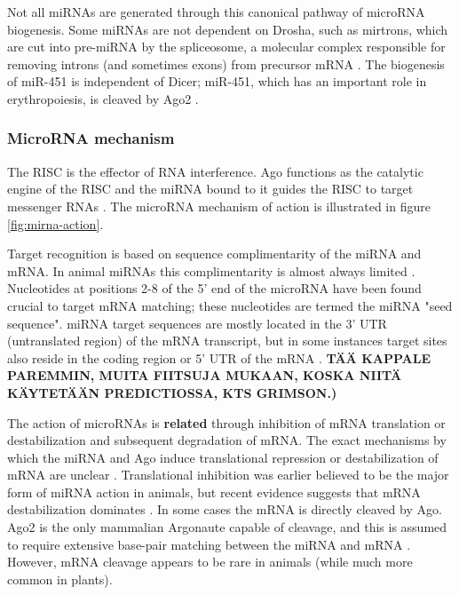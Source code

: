 Not all miRNAs are generated through this canonical pathway of microRNA
biogenesis. Some miRNAs are not dependent on Drosha, such as mirtrons, which
are cut into pre-miRNA by the spliceosome, a molecular complex responsible for
removing introns (and sometimes exons) from precursor mRNA \citep{Ruby2007}. The
biogenesis of miR-451 is independent of Dicer; miR-451, which
has an important role in erythropoiesis, is cleaved by Ago2 \citep{Cheloufi2010}.






\subsubsection{MicroRNA mechanism}\label{microrna-mechanism}

The RISC is the effector of RNA interference. Ago functions as the catalytic
engine of the RISC and the miRNA bound to it guides the RISC to target
messenger RNAs \citep{Filipowicz2008}. The microRNA mechanism of action is
illustrated in figure \ref{fig:mirna-action}.

Target recognition is based on sequence complimentarity of the miRNA and mRNA.
In animal miRNAs this complimentarity is almost always limited \citep{Ambros2004}.
Nucleotides at positions 2-8 of the 5' end of the microRNA have been found
crucial to target mRNA matching; these nucleotides are termed the miRNA "seed sequence".
miRNA target sequences are mostly located in the 3' UTR (untranslated region)
of the mRNA transcript, but in some instances target sites also reside in the
coding region or 5' UTR of the mRNA \citep{Bartel2009}.
\textbf{TÄÄ KAPPALE PAREMMIN, MUITA FIITSUJA MUKAAN, KOSKA NIITÄ KÄYTETÄÄN PREDICTIOSSA, KTS GRIMSON.)}

The action of microRNAs is \textbf{related} through inhibition of mRNA
translation or destabilization and subsequent degradation of mRNA. The exact
mechanisms by which the miRNA and Ago induce translational repression or
destabilization of mRNA are unclear \citep{Filipowicz2008}. Translational
inhibition was earlier believed to be the major form of miRNA action in animals,
but recent evidence suggests that mRNA destabilization dominates \citep{Guo2010}.
In some cases the mRNA is directly cleaved by Ago. Ago2 is the only mammalian
Argonaute capable of cleavage, and this is assumed to require
extensive base-pair matching between the miRNA and mRNA \citep{Du2005}.
However, mRNA cleavage appears to be rare in animals (while much more common
in plants).

